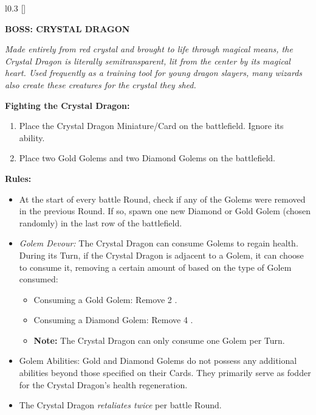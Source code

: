 \begin{wrapfigure}{l}{0.3\textwidth}
  \raisebox{0pt}[\dimexpr{}\baselineskip\relax]{}
\end{wrapfigure}
{
  \textbf{\MakeUppercase{Boss: Crystal Dragon}}

  \medskip

  \textit{Made entirely from red crystal and brought to life through magical means, the Crystal Dragon is literally semitransparent, lit from the center by its magical heart.
    Used frequently as a training tool for young dragon slayers, many wizards also create these creatures for the crystal they shed.
  }

  \medskip

  \textbf{Fighting the Crystal Dragon:}
  \begin{enumerate}
    \item Place the Crystal Dragon Miniature/Card on the battlefield.
      Ignore its ability.
    \item Place two Gold Golems and two Diamond Golems on the battlefield.
  \end{enumerate}

  \medskip

  \textbf{Rules:}
  \begin{itemize}
    \item At the start of every battle Round, check if any of the Golems were removed in the previous Round.
      If so, spawn one new Diamond or Gold Golem (chosen randomly) in the last row of the battlefield.
    \item \textit{Golem Devour:} The Crystal Dragon can consume Golems to regain health.
      During its Turn, if the Crystal Dragon is adjacent to a Golem, it can choose to consume it, removing a certain amount of  based on the type of Golem consumed:
      \begin{itemize}
        \item Consuming a Gold Golem: Remove 2 .
        \item Consuming a Diamond Golem: Remove 4 .
        \item[] \textbf{Note:} The Crystal Dragon can only consume one Golem per Turn.
      \end{itemize}
    \item Golem Abilities: Gold and Diamond Golems do not possess any additional abilities beyond those specified on their Cards.
      They primarily serve as fodder for the Crystal Dragon's health regeneration.
    \item The Crystal Dragon \textit{retaliates twice} per battle Round.
  \end{itemize}
}

